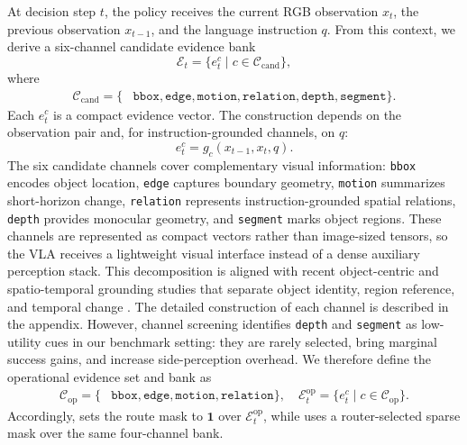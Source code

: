 At decision step $t$, the policy receives the current RGB observation $x_t$, the previous observation $x_{t-1}$, and the language instruction $q$. From this context, we derive a six-channel candidate evidence bank
\begin{equation}
\mathcal{E}_t = \{e_t^{c} \mid c \in \mathcal{C}_{\mathrm{cand}}\},
\end{equation}
where
\begin{equation}
\begin{aligned}
\mathcal{C}_{\mathrm{cand}} = \{&
\texttt{bbox},\texttt{edge},\texttt{motion},\texttt{relation},\texttt{depth},\texttt{segment}\}.
\end{aligned}
\end{equation}
Each $e_t^c$ is a compact evidence vector. The construction depends on the observation pair and, for instruction-grounded channels, on $q$:
\begin{equation}
e_t^c = g_c(x_{t-1}, x_t, q).
\end{equation}
The six candidate channels cover complementary visual information: \texttt{bbox} encodes object location, \texttt{edge} captures boundary geometry, \texttt{motion} summarizes short-horizon change, \texttt{relation} represents instruction-grounded spatial relations, \texttt{depth} provides monocular geometry, and \texttt{segment} marks object regions. These channels are represented as compact vectors rather than image-sized tensors, so the VLA receives a lightweight visual interface instead of a dense auxiliary perception stack. This decomposition is aligned with recent object-centric and spatio-temporal grounding studies that separate object identity, region reference, and temporal change \citep{ravi2024sam2,yuan2025pixelrefer,yuan2025videorefer}. The detailed construction of each channel is described in the appendix.
However, channel screening identifies \texttt{depth} and \texttt{segment} as low-utility cues in our benchmark setting: they are rarely selected, bring marginal success gains, and increase side-perception overhead. We therefore define the operational evidence set and bank as
\begin{equation}
\begin{aligned}
\mathcal{C}_{\mathrm{op}} = \{&
\texttt{bbox},\texttt{edge},\texttt{motion},\texttt{relation}\}, \quad
\mathcal{E}_t^{\mathrm{op}}=\{e_t^c \mid c \in \mathcal{C}_{\mathrm{op}}\}.
\end{aligned}
\end{equation}
Accordingly, \textbf{\fullsoft{}} sets the route mask to $\mathbf{1}$ over $\mathcal{E}_t^{\mathrm{op}}$, while \textbf{\method{}} uses a router-selected sparse mask over the same four-channel bank.


